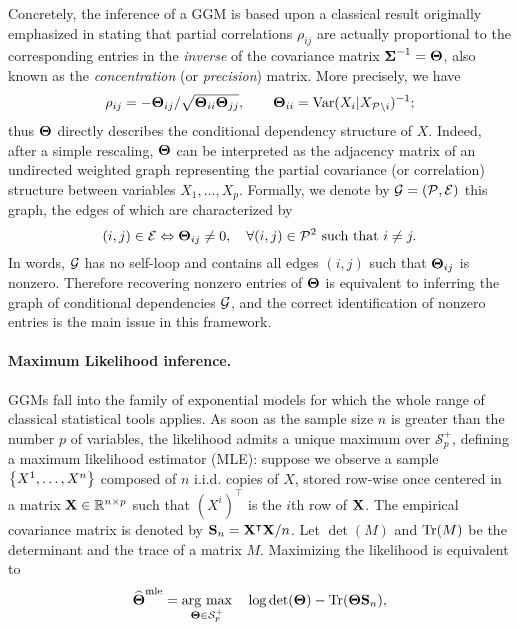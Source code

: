 Concretely, the inference of a GGM is based upon a classical result
originally emphasized in \cite{1972_Biometrics_Dempster} stating that
partial correlations $\rho_{ij}$ are actually proportional to the
corresponding entries in the \emph{inverse} of the covariance matrix
${\boldsymbol\Sigma}^{-1} = \boldsymbol\Theta$, also known as the \emph{concentration} (or
\emph{precision}) matrix. More precisely, we have
\begin{equation}
  \label{eq:parcor2invcov}
  \rho_{ij}      =  -\invcov_{ij}      /
  \sqrt{\invcov_{ii} \invcov_{jj}}, \qquad \invcov_{ii}=
  \var(X_i|X_{\mathcal{P}\backslash i})^{-1};
\end{equation}
thus $\boldsymbol\Theta$ directly describes the conditional dependency structure
of $X$. Indeed, after a simple rescaling, $\boldsymbol\Theta$ can be interpreted
as the adjacency  matrix of an undirected  weighted graph representing
the partial  covariance (or  correlation) structure  between variables
$X_{1},\ldots,X_{p}$. Formally,  we denote by $\mathcal{G}  = (\mathcal{P},
\mathcal{E})$ this graph, the edges of which are characterized by
\begin{displaymath}
  (i,j) \in \mathcal{E} \Leftrightarrow \boldsymbol\Theta_{ij} \neq 0, \quad \forall
  (i,j) \in \mathcal{P}^2 \text{ such that } i\neq j.
\end{displaymath}
In words,  $\mathcal{G}$ has  no self-loop and  contains all  edges $(i,j)$
such  that $\boldsymbol\Theta_{ij}$  is nonzero.   Therefore recovering  nonzero
entries  of  $\boldsymbol\Theta$  is  equivalent   to  inferring  the  graph  of
conditional dependencies  $\mathcal{G}$, and the correct  identification of
nonzero entries is the main issue in this framework.

\paragraph*{Maximum Likelihood inference.}  GGMs fall into the family
of exponential models for which the whole range of classical
statistical tools applies.  As soon as the sample size $n$ is greater
than the number $p$ of variables, the likelihood admits a unique
maximum over $\mathcal{S}_{p}^+$, defining a maximum likelihood
estimator (MLE): suppose we observe a sample $\left\{X^1,\dots,X^n\right\}$
composed of $n$ i.i.d.  copies of $X$, stored row-wise once centered
in a matrix $\mathbf{X} \in \mathbb{R}^{n\times p}$ such that $(X^i)^\top$ is the
$i$th row of $\mathbf{X}$.  The empirical covariance matrix is denoted by
$\mathbf{S}_n = \mathbf{X}^\intercal \mathbf{X}/n$. Let $\det(M)$ and
$\mathrm{Tr}(M)$ be the determinant and the trace of a matrix $M$.
Maximizing the likelihood is equivalent to
\begin{equation}
\label{eq:MLE_GGM}
\widehat{\invcov}^{\text{mle}} = \argmax_{\invcov  \in \mathcal{S}_p^+}\quad
\log \det(\invcov) - \trace(\invcov \empcov),
\end{equation}


